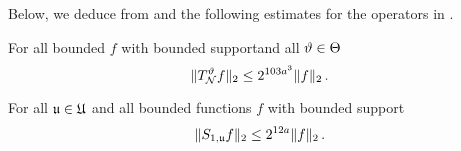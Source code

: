 Below, we deduce  from  and the following estimates for the operators in .

\begin{lemma}
    \label{nontangential-operator-bound}
    \leanok
    For all bounded $f$ with bounded supportand all ${\vartheta} \in {\Theta}$
    $$
        \|T_{\mathcal{N}}^{{\vartheta}} f\|_2 \le 2^{103a^3} \|f\|_2\,.
    $$
\end{lemma}

\begin{lemma}
    \label{boundary-operator-bound}
    \leanok
    For all ${\mathfrak u} \in {\mathfrak U}$ and all bounded functions $f$ with bounded support
    \begin{equation}
        \label{eq-S-bound}
        \|S_{1,{\mathfrak u}}f\|_2 \le 2^{12a} \|f\|_2\,.
    \end{equation}
\end{lemma}

